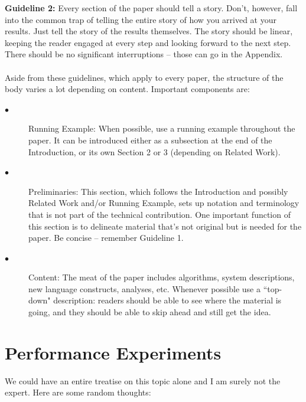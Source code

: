 \documentclass[10pt,twocolumn]{article}
\begin{document}
\textbf{Guideline 2:} Every section of the paper should tell a story. Don't, however, fall into the common trap of telling the entire story of how you arrived at your results. Just tell the story of the results themselves. The story should be linear, keeping the reader engaged at every step and looking forward to the next step. There should be no significant interruptions -- those can go in the Appendix.
\\
\\
Aside from these guidelines, which apply to every paper, the structure of the body varies a lot depending on content. Important components are:

\begin{description}
  \item[$\bullet$]  Running Example: When possible, use a running example throughout the paper. It can be introduced either as a subsection at the end of the Introduction, or its own Section 2 or 3 (depending on Related Work).
  \item[$\bullet$]  Preliminaries: This section, which follows the Introduction and possibly Related Work and/or Running Example, sets up notation and terminology that is not part of the technical contribution. One important function of this section is to delineate material that's not original but is needed for the paper. Be concise -- remember Guideline 1.
    \item[$\bullet$] Content: The meat of the paper includes algorithms, system descriptions, new language constructs, analyses, etc. Whenever possible use a ``top-down" description: readers should be able to see where the material is going, and they should be able to skip ahead and still get the idea.
\end{description}


\section{Performance Experiments}

We could have an entire treatise on this topic alone and I am surely not the expert. Here are some random thoughts:
\end{document}
